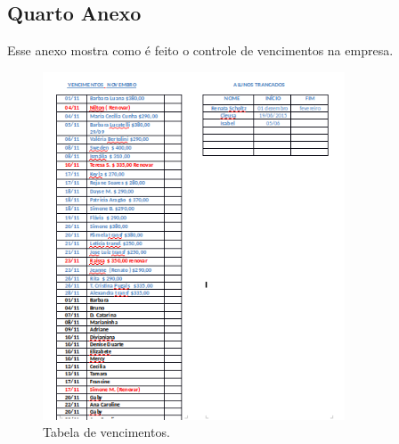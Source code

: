 \begin{anexosenv}
\chapter{Quarto Anexo}
Esse anexo mostra como é feito o controle de vencimentos na empresa.
\begin{figure}[h!]
    \centering
    \includegraphics[width=0.8\textwidth]{figuras/vencimentos.png}
    \caption{Tabela de vencimentos.}
    \label{fig:vencimentos}
\end{figure}
\end{anexosenv}
